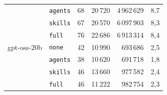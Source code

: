 \begin{table}[!htb]
\begin{tabular}{llrrrr}
         & \texttt{agents} & 68 & 20\,720 & 4\,962\,629 & 8,7 \\
         & \texttt{skills} & 67 & 20\,570 & 6\,097\,903 & 8,3 \\
         & \texttt{full} & 76 & 22\,686 & 6\,913\,314 & 8,4 \\
        \midrule
        gpt-oss-20b & \texttt{none} & 42 & 10\,990 & 693\,686 & 2,5 \\
         & \texttt{agents} & 38 & 10\,620 & 691\,718 & 1,8 \\
         & \texttt{skills} & 46 & 13\,660 & 977\,582 & 2,4 \\
         & \texttt{full} & 46 & 11\,222 & 982\,754 & 2,3 \\
        \bottomrule
    \end{tabular}
\end{table}


